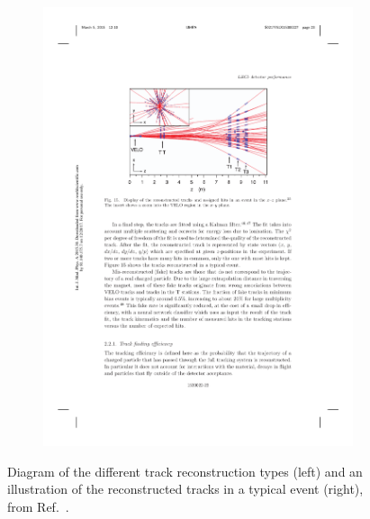 \begin{figure}[!h]
\begin{subfigure}[m]{0.4\textwidth}
        \includegraphics[width=1.0\textwidth]{figs/Detector/reco_track_reco.pdf}
    \end{subfigure}
    \caption{Diagram of the different track reconstruction types (left) and an illustration of the reconstructed tracks in a typical event (right), from Ref.~\cite{LHCb-DP-2014-002}.}
    \label{fig:Dec_reco_tracks}   
\end{figure}



